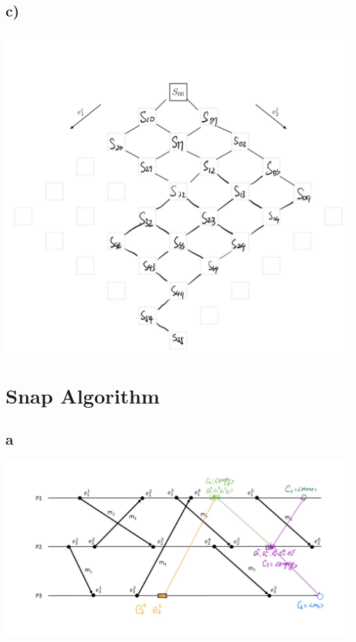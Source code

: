 \documentclass{article}
\begin{document}
\subsection*{c)}
\includegraphics[scale=0.5]{A3C.png}
\section{Snap Algorithm}
\subsection*{a}
\includegraphics[scale=0.6]{A4.png}
\end{document}
